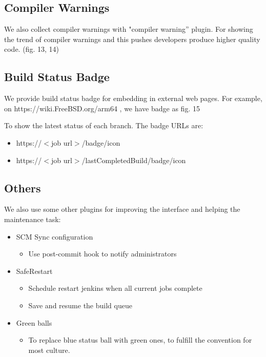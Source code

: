 \documentclass[a4paper,twocolumn,10pt]{article}
\begin{document}
\subsection{Compiler Warnings}

We also collect compiler warnings with "compiler warning” plugin. For showing
the trend of compiler warnings and this pushes developers produce higher
quality code. (fig. 13, 14)

\subsection{Build Status Badge}

We provide build status badge for embedding in external web pages. For example,
on https://wiki.FreeBSD.org/arm64 , we have badge as fig. 15

To show the latest status of each branch. The badge URLs are:
\begin{itemize}
\item https://$<$job url$>$/badge/icon
\item https://$<$job url$>$/lastCompletedBuild/badge/icon
\end{itemize}

\subsection{Others}

We also use some other plugins for improving the interface and helping the
maintenance task:

\begin{itemize}
\item SCM Sync configuration
  \begin{itemize}
  \item Use post-commit hook to notify administrators
  \end{itemize}
\item SafeRestart
  \begin{itemize}
  \item Schedule restart jenkins when all current jobs complete
  \item Save and resume the build queue
  \end{itemize}
\item Green balls
  \begin{itemize}
  \item To replace blue status ball with green ones, to fulfill the convention
        for most culture.
  \end{itemize}
\end{itemize}
\end{document}
